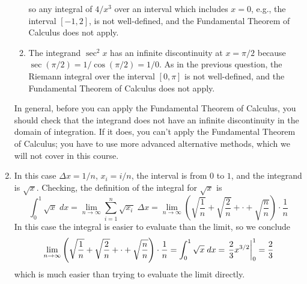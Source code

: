 \documentclass{article}
\begin{document}
\begin{enumerate}
\begin{enumerate}
    so any integral of $4/x^3$ over an interval which includes $x=0$,
    e.g., the interval $[-1,2]$, is not well-defined, and the
    Fundamental Theorem of Calculus does not apply.
  \item The integrand $\sec^2 x$ has an infinite discontinuity at
    $x=\pi/2$ because $\sec (\pi/2) = 1/\cos(\pi/2) = 1/0$.  As in the
    previous question, the Riemann integral over the interval
    $[0,\pi]$ is not well-defined, and the Fundamental Theorem of
    Calculus does not apply.
  \end{enumerate}
  In general, before you can apply the Fundamental Theorem of
  Calculus, you should check that the integrand does not have an
  infinite discontinuity in the domain of integration.  If it does,
  you can't apply the Fundamental Theorem of Calculus; you have to use
  more advanced alternative methods, which we will not cover in this
  course.
\item In this case $\Delta x = 1/n$, $x_i = i/n$, the interval is from
  $0$ to $1$, and the integrand is $\sqrt{x}$.  Checking, the
  definition of the integral for $\sqrt{x}$ is
  \begin{equation*}
    \int_0^1 \sqrt{x} \; dx = \lim_{n\to\infty} \sum_{i=1}^n
    \sqrt{x_i} \; \Delta x
    = \lim_{n\to\infty} \left( \sqrt{\frac{1}{n}} + \sqrt{\frac{2}{n}}
      + \cdot + \sqrt{\frac{n}{n}} \right) \cdot \frac{1}{n}
  \end{equation*}
  In this case the integral is easier to evaluate than the limit, so
  we conclude
  \begin{equation*}
    \lim_{n\to\infty} \left( \sqrt{\frac{1}{n}} + \sqrt{\frac{2}{n}}
      + \cdot + \sqrt{\frac{n}{n}} \right) \cdot \frac{1}{n}
    = \int_0^1 \sqrt{x} \; dx = \left. \vphantom{\int} \frac{2}{3}
      x^{3/2} \right|_0^1 = \frac{2}{3}
  \end{equation*}
  which is much easier than trying to evaluate the limit directly.
\end{enumerate}
\end{document}

